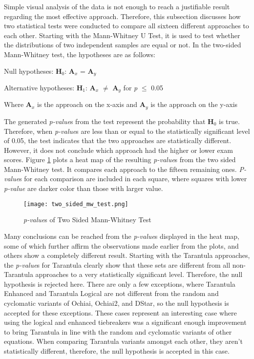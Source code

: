 Simple visual analysis of the data is not enough to reach a justifiable result
regarding the most effective approach. Therefore, this subsection discusses how
two statistical tests were conducted to compare all sixteen different approaches to
each other. Starting with the Mann-Whitney U Test, it is used to test whether
the distributions of two independent samples are equal or not. In the two-sided
Mann-Whitney test, the hypotheses are as follows:
\begin{center}
    Null hypotheses: \textbf{H$_{0}$}: \textbf{A$_{x}$} = \textbf{A$_{y}$}

    Alternative hypotheses: \textbf{H$_{1}$}: \textbf{A$_{x}$} $\neq$
    \textbf{A$_{y}$}
    for \emph{p} $\leq$  0.05

    Where \textbf{A$_{x}$} is the approach on the x-axis and \textbf{A$_{y}$} is
    the approach on the y-axis
\end{center}

The generated \emph{p-value}s from the test represent the probability that
\textbf{H$_{0}$} is true. Therefore, when \emph{p-value}s are less than or equal to the statistically
significant level of 0.05, the test indicates that the two approaches are
statistically different. However, it does not conclude which approach had the
higher or lower exam scores. Figure \ref{fig:two_sided_mw_test} plots a heat map
of the resulting \emph{p-value}s from the two sided Mann-Whitney test. It compares each
approach to the fifteen remaining ones. \emph{P-value}s for each comparison are
included in each square, where squares with lower \emph{p-value} are
darker color than those with larger value.
\begin{figure}[!htb]
	\begin{center}
		\texttt{[image: two\_sided\_mw\_test.png]}
        \caption{\label{fig:two_sided_mw_test} \emph{p-value}s of Two Sided Mann-Whitney Test}
	\end{center}
\end{figure}

Many conclusions can be reached from the \emph{p-value}s displayed in the heat map,
some of which further affirm the observations made earlier from the plots, and
others show a completely different result. Starting with the Tarantula
approaches, the \emph{p-value}s for Tarantula clearly
show that these sets are different from all non-Tarantula approaches to a very
statistically significant level.
Therefore, the null hypothesis is rejected
here. There are only a few exceptions, where Tarantula Enhanced and Tarantula
Logical are not different from the random and cyclomatic variants of Ochiai,
Ochiai2, and DStar, so the null hypothesis is accepted for these exceptions.
These cases represent an interesting case where using the logical and enhanced
tiebreakers was a significant enough improvement to bring Tarantula in line with
the random and cyclomatic variants of other equations.
When comparing Tarantula variants amongst each other, they aren't statistically
different, therefore, the null hypothesis is
accepted in this case.

